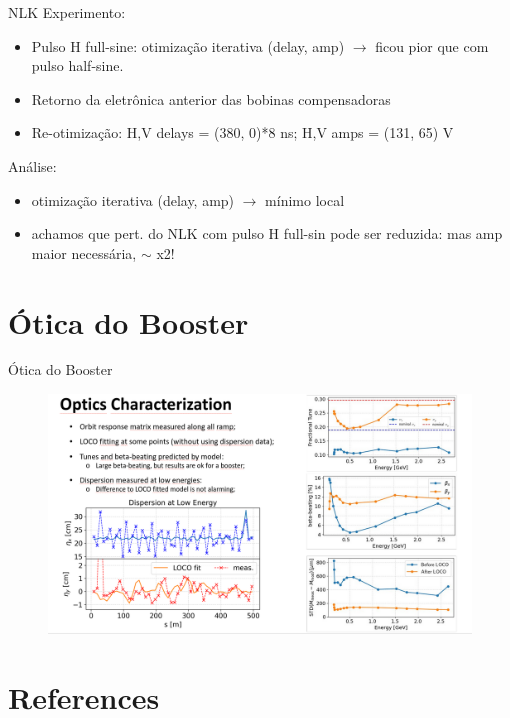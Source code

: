 \documentclass[1610]{beamer}					  %
\begin{document}
\begin{frame}{NLK}
    Experimento:
    \begin{itemize}
    		\item Pulso H full-sine: otimização iterativa (delay, amp) $\rightarrow$ ficou pior que com pulso half-sine.
            \item Retorno da eletrônica anterior das bobinas compensadoras
            \item Re-otimização: H,V delays = (380, 0)*8 ns; H,V amps = (131, 65) V
    \end{itemize}
    Análise:
    \begin{itemize}
            \item otimização iterativa (delay, amp) $\rightarrow$ mínimo local
            \item achamos que pert. do NLK com pulso H full-sin pode ser reduzida: {\color{red} mas amp maior necessária,  $\sim$ x2!}
    \end{itemize}
\end{frame}



\section{Ótica do Booster}

\begin{frame}{Ótica do Booster}
    \begin{figure}[H]
    		\centering
            \includegraphics[width=1.1\textwidth]{2024-02-16/figures/bo-optics.png}
            \label{fig:bo-optics}
    \end{figure}
\end{frame}



\section{References}
\end{document}
